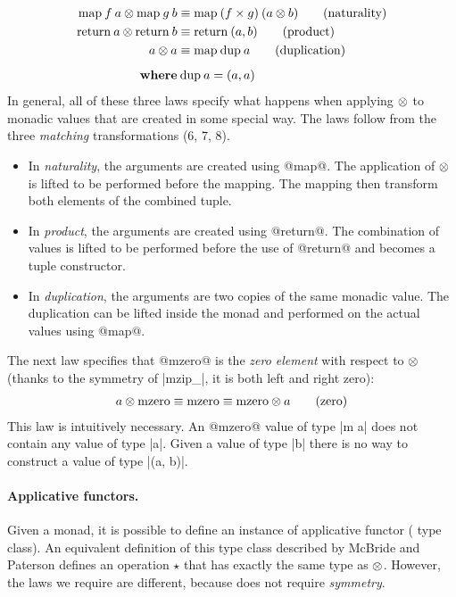 \documentclass[preprint]{sigplanconf}
\begin{document}
\begin{align*}
  \text{map} \: f \: a \otimes \text{map} \: g \: b &\equiv \text{map} \: (f \times g) \: (a \otimes b) \tag{naturality} \\
  \text{return} \: a \otimes \text{return} \: b &\equiv \text{return} \: (a, b) \tag{product} \\
  a \otimes a &\equiv \text{map} \: \text{dup} \: a \tag{duplication} \\
\\[-10pt]
  \textbf{where} & \: \text{dup} \: a = (a, a)
\end{align*}
In general, all of these three laws specify what happens when applying $\otimes$ to monadic values 
that are created in some special way. The laws follow from the three \textit{matching} 
transformations (6, 7, 8).
\begin{itemize}
\item In \textit{naturality}, the arguments are created using @map@. The application of $\otimes$ is
  lifted to be performed before the mapping. The mapping then transform both elements of the 
  combined tuple.
  
\item In \textit{product}, the arguments are created using @return@. The combination of values is
  lifted to be performed before the use of @return@ and becomes a tuple constructor.

\item In \textit{duplication}, the arguments are two copies of the same monadic value. The 
  duplication can be lifted inside the monad and performed on the actual values using @map@.

\end{itemize}
The next law specifies that @mzero@ is the \textit{zero element} with respect to $\otimes$
(thanks to the symmetry of |mzip_|, it is both left and right zero):
\begin{align*}
  a \otimes \text{mzero} \equiv \text{mzero} \equiv \text{mzero} \otimes a \tag {zero} 
\end{align*}
This law is intuitively necessary. An @mzero@ value of type |m a| does not contain any value of type
|a|. Given a value of type |b| there is no way to construct a value of type |(a, b)|.

\paragraph{Applicative functors.} Given a monad, it is possible to define an instance of applicative
functor ( type class). An equivalent definition of this type class described
by McBride and Paterson \cite{applicative} defines an operation $\star$ that has exactly 
the same type as $\otimes$. However, the laws we require are different, because 
does not require \textit{symmetry}. 
\end{document}

